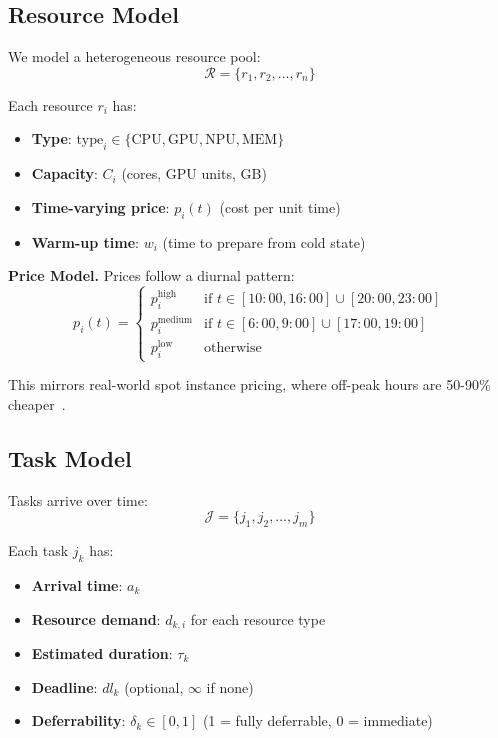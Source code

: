 \documentclass[10pt,conference]{IEEEtran}
\begin{document}
\subsection{Resource Model}

We model a heterogeneous resource pool:
\begin{equation}
\mathcal{R} = \{r_1, r_2, \ldots, r_n\}
\end{equation}

Each resource $r_i$ has:
\begin{itemize}
    \item \textbf{Type}: $\text{type}_i \in \{\text{CPU}, \text{GPU}, \text{NPU}, \text{MEM}\}$
    \item \textbf{Capacity}: $C_i$ (cores, GPU units, GB)
    \item \textbf{Time-varying price}: $p_i(t)$ (cost per unit time)
    \item \textbf{Warm-up time}: $w_i$ (time to prepare from cold state)
\end{itemize}

\textbf{Price Model.} Prices follow a diurnal pattern:
\begin{equation}
p_i(t) = \begin{cases}
p_i^{\text{high}} & \text{if } t \in [10:00, 16:00] \cup [20:00, 23:00] \\
p_i^{\text{medium}} & \text{if } t \in [6:00, 9:00] \cup [17:00, 19:00] \\
p_i^{\text{low}} & \text{otherwise}
\end{cases}
\end{equation}

This mirrors real-world spot instance pricing, where off-peak hours are 50-90\% cheaper~\cite{aws2025spot}.

\subsection{Task Model}

Tasks arrive over time:
\begin{equation}
\mathcal{J} = \{j_1, j_2, \ldots, j_m\}
\end{equation}

Each task $j_k$ has:
\begin{itemize}
    \item \textbf{Arrival time}: $a_k$
    \item \textbf{Resource demand}: $d_{k,i}$ for each resource type
    \item \textbf{Estimated duration}: $\tau_k$
    \item \textbf{Deadline}: $dl_k$ (optional, $\infty$ if none)
    \item \textbf{Deferrability}: $\delta_k \in [0, 1]$ (1 = fully deferrable, 0 = immediate)
\end{itemize}
\end{document}
